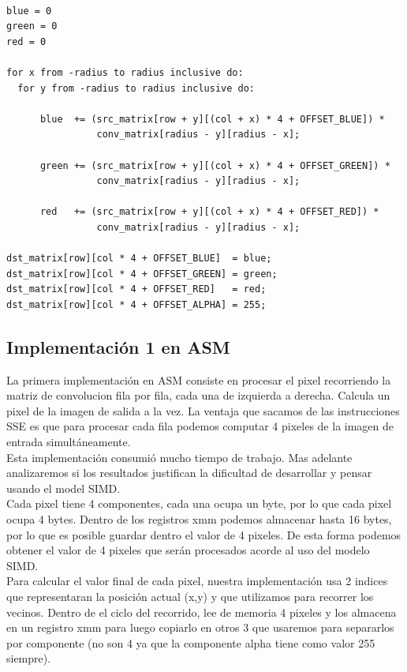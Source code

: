 \documentclass[10pt,a4paper,spanish]{article}
\begin{document}
\begin{codesnippet}
\begin{verbatim}

blue = 0
green = 0
red = 0

for x from -radius to radius inclusive do:
  for y from -radius to radius inclusive do:

      blue  += (src_matrix[row + y][(col + x) * 4 + OFFSET_BLUE]) *
                conv_matrix[radius - y][radius - x];

      green += (src_matrix[row + y][(col + x) * 4 + OFFSET_GREEN]) *
                conv_matrix[radius - y][radius - x];

      red   += (src_matrix[row + y][(col + x) * 4 + OFFSET_RED]) *
                conv_matrix[radius - y][radius - x];

dst_matrix[row][col * 4 + OFFSET_BLUE]  = blue;
dst_matrix[row][col * 4 + OFFSET_GREEN] = green;
dst_matrix[row][col * 4 + OFFSET_RED]   = red;
dst_matrix[row][col * 4 + OFFSET_ALPHA] = 255;

\end{verbatim}
\end{codesnippet}

\subsection{Implementación 1 en ASM}

La primera implementación en ASM consiste en procesar el pixel recorriendo la matriz de convolucion fila por fila, cada una de izquierda a derecha.
Calcula un pixel de la imagen de salida a la vez. La ventaja que sacamos de las instrucciones SSE es que para procesar cada fila podemos computar 4 pixeles de la imagen de entrada simultáneamente. \\

Esta implementación consumió mucho tiempo de trabajo. Mas adelante analizaremos si los resultados justifican la dificultad de desarrollar y pensar usando el model SIMD. \\

Cada pixel tiene 4 componentes, cada una ocupa un byte, por lo que cada pixel ocupa 4 bytes. Dentro de los registros xmm podemos almacenar hasta 16 bytes, por lo que es posible guardar dentro el valor de 4 pixeles. De esta forma podemos obtener el valor de 4 pixeles que serán procesados acorde al uso del modelo SIMD. \\

Para calcular el valor final de cada pixel, nuestra implementación usa 2 indices que representaran la posición actual (x,y) y que utilizamos para recorrer los vecinos. Dentro de el ciclo del recorrido, lee de memoria 4 pixeles y los almacena en un registro xmm para luego copiarlo en otros 3 que usaremos para separarlos por componente (no son 4 ya que la componente alpha tiene como valor 255 siempre).
\end{document}
